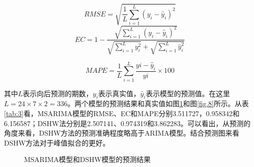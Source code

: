 \documentclass[lang=cn,11pt,a4paper]{elegantpaper}
\begin{document}
\begin{equation}
RMSE=\sqrt{\frac{1}{L}\sum\limits_{i=1}^{L}(y_i-\hat{y}_i)^2}
\end{equation}
\begin{equation}
EC=1-\frac{\sqrt{\sum\limits_{i=1}^{L}(y_i-\hat{y}_i)^2}}{\sqrt{\sum\limits_{i=1}^{L}y_i^2}+\sqrt{\sum\limits_{i=1}^{L}\hat{y}_i^2}}
\end{equation}

\begin{equation}
MAPE=\frac{1}{L} \sum\limits_{i=1}^L \frac{yi - \hat{y}_i}{yi}\times100
\end{equation}

其中$L$表示向后预测的期数，$y_i$表示真实值，$\hat{y}_i$表示模型的预测值。在这里$L=24\times7\times2=336$。两个模型的预测结果和真实值如图\ref{fig.7}和图\ref{fig.8}所示。从表\ref{tab:3}看，MSARIMA模型的RMSE、EC和MAPE分别3.511727，0.958342和6.156587；DSHW法分别是2.507141、0.974319和3.862283。可以看出，从预测的角度来看，DSHW方法的预测准确程度略高于ARIMA模型。结合预测图来看DSHW方法对于峰值拟合的更好。

\begin{table}[htbp]
\caption{两种模型预测准确率比较}
\centering
\label{tab:3}
\end{table}

\begin{figure}[H]
\centering  %
\caption{MSARIMA模型和DSHW模型的预测结果}
\label{fig.7}
\end{figure}
\end{document}

